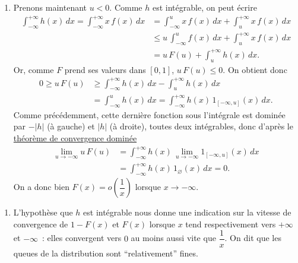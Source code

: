 \label{I-answer-dlfdr-mi}

\begin{enumerate}
\def\labelenumi{\arabic{enumi}.}
\setcounter{enumi}{2}
\tightlist
\item
  Prenons maintenant \(u<0\). Comme \(h\) est intégrable, on peut écrire
  \begin{align*}
  \int_{-\infty}^{+\infty} h(x)\,dx = \int_{-\infty}^{+\infty} x\,f(x)\,dx & = \int_{-\infty}^{u} x\,f(x)\,dx + \int_{u}^{+\infty} x\,f(x)\,dx\\
  &\leq u\, \int_{-\infty}^{u} f(x)\,dx + \int_{u}^{+\infty} x\,f(x)\,dx\\
  &= u\,F(u) + \int_{u}^{+\infty} h(x)\,dx.
  \end{align*} Or, comme \(F\) prend ses valeurs dans \([0,1]\),
  \(u\,F(u) \leq 0\). On obtient donc \begin{align*}
  0 \geq u\,F(u) & \geq \int_{-\infty}^{+\infty} h(x)\,dx - \int_{u}^{+\infty} h(x)\,dx\\
  &= \int_{-\infty}^{u} h(x)\,dx = \int_{-\infty}^{+\infty} h(x)\,1_{[-\infty,u]}(x)\,dx.
  \end{align*} Comme précédemment, cette dernière fonction sous
  l'intégrale est dominée par \(-\left|h\right|\) (à gauche) et
  \(\left|h\right|\) (à droite), toutes deux intégrables, donc d'après
  le \href{Calcul\%20Intégral\%20II.pdf\%20\#TCD}{théorème de
  convergence dominée} \begin{align*}
  \lim_{u\to-\infty} u\,F(u) & = \int_{-\infty}^{+\infty} h(x)\,\lim_{u\to-\infty} 1_{[-\infty,u]}(x)\,dx\\
  & = \int_{-\infty}^{+\infty} h(x)\,1_{\varnothing}(x)\,dx = 0.
  \end{align*} On a donc bien \(F(x) = o\left(\dfrac{1}{x}\right)\)
  lorsque \(x\to-\infty\).
\end{enumerate}

\label{I-answer-dlfdr-interpret}

\begin{enumerate}
\def\labelenumi{\arabic{enumi}.}
\setcounter{enumi}{3}
\tightlist
\item
  L'hypothèse que \(h\) est intégrable nous donne une indication sur la
  vitesse de convergence de \(1-F(x)\) et \(F(x)\) lorsque \(x\) tend
  respectivement vers \(+\infty\) et \(-\infty\)~: elles convergent vers
  \(0\) au moins aussi vite que \(\dfrac{1}{x}\). On dit que les queues
  de la distribution sont ``relativement'' fines.
\end{enumerate}

